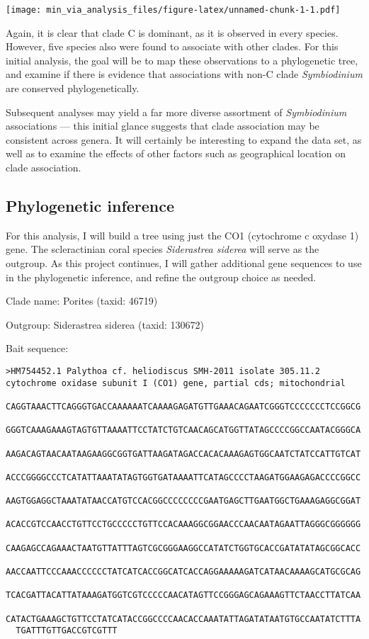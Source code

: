 \documentclass[]{article}
\begin{document}
\texttt{[image: min\_via\_analysis\_files/figure-latex/unnamed-chunk-1-1.pdf]}

Again, it is clear that clade C is dominant, as it is observed in every
species. However, five species also were found to associate with other
clades. For this initial analysis, the goal will be to map these
observations to a phylogenetic tree, and examine if there is evidence
that associations with non-C clade \emph{Symbiodinium} are conserved
phylogenetically.

Subsequent analyses may yield a far more diverse assortment of
\emph{Symbiodinium} associations --- this initial glance suggests that
clade association may be consistent across genera. It will certainly be
interesting to expand the data set, as well as to examine the effects of
other factors such as geographical location on clade association.

\subsection{Phylogenetic inference}\label{phylogenetic-inference}

For this analysis, I will build a tree using just the CO1 (cytochrome c
oxydase 1) gene. The scleractinian coral species \emph{Siderastrea
siderea} will serve as the outgroup. As this project continues, I will
gather additional gene sequences to use in the phylogenetic inference,
and refine the outgroup choice as needed.

Clade name: Porites (taxid: 46719)

Outgroup: Siderastrea siderea (taxid: 130672)

Bait sequence:

\begin{verbatim}
>HM754452.1 Palythoa cf. heliodiscus SMH-2011 isolate 305.11.2 cytochrome oxidase subunit I (CO1) gene, partial cds; mitochondrial
  CAGGTAAACTTCAGGGTGACCAAAAAATCAAAAGAGATGTTGAAACAGAATCGGGTCCCCCCCTCCGGCG
  GGGTCAAAGAAAGTAGTGTTAAAATTCCTATCTGTCAACAGCATGGTTATAGCCCCGGCCAATACGGGCA
  AAGACAGTAACAATAAGAAGGCGGTGATTAAGATAGACCACACAAAGAGTGGCAATCTATCCATTGTCAT
  ACCCGGGGCCCTCATATTAAATATAGTGGTGATAAAATTCATAGCCCCTAAGATGGAAGAGACCCCGGCC
  AAGTGGAGGCTAAATATAACCATGTCCACGGCCCCCCCCGAATGAGCTTGAATGGCTGAAAGAGGCGGAT
  ACACCGTCCAACCTGTTCCTGCCCCCTGTTCCACAAAGGCGGAACCCAACAATAGAATTAGGGCGGGGGG
  CAAGAGCCAGAAACTAATGTTATTTAGTCGCGGGAAGGCCATATCTGGTGCACCGATATATAGCGGCACC
  AACCAATTCCCAAACCCCCCTATCATCACCGGCATCACCAGGAAAAAGATCATAACAAAAGCATGCGCAG
  TCACGATTACATTATAAAGATGGTCGTCCCCCAACATAGTTCCGGGAGCAGAAAGTTCTAACCTTATCAA
  CATACTGAAAGCTGTTCCTATCATACCGGCCCCAACACCAAATATTAGATATAATGTGCCAATATCTTTA
  TGATTTGTTGACCGTCGTTT
\end{verbatim}
\end{document}
